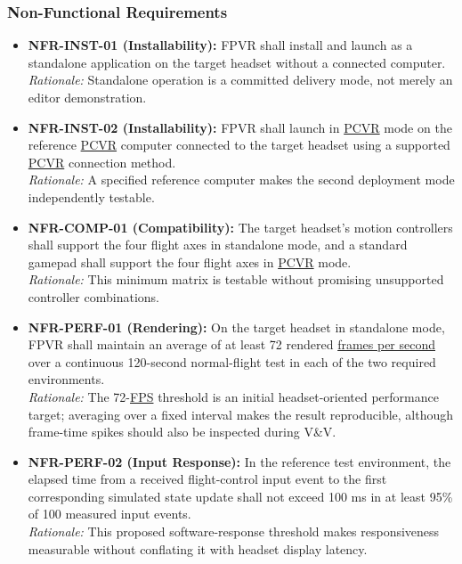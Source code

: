 \documentclass[12pt]{article}
\begin{document}
\subsubsection{Non-Functional Requirements}
\label{sec:s2-nfr}
\begin{itemize}
\item \hypertarget{req:NFR-INST-01}{}\textbf{NFR-INST-01 (Installability):} FPVR shall install and launch as a standalone application on the target headset without a connected computer.\\
\textit{Rationale:} Standalone operation is a committed delivery mode, not merely an editor demonstration.
\item \hypertarget{req:NFR-INST-02}{}\textbf{NFR-INST-02 (Installability):} FPVR shall launch in \hyperlink{glos:PCVR}{PCVR} mode on the reference \hyperlink{glos:PCVR}{PCVR} computer connected to the target headset using a supported \hyperlink{glos:PCVR}{PCVR} connection method.\\
\textit{Rationale:} A specified reference computer makes the second deployment mode independently testable.
\item \hypertarget{req:NFR-COMP-01}{}\textbf{NFR-COMP-01 (Compatibility):} The target headset's motion controllers shall support the four flight axes in standalone mode, and a standard gamepad shall support the four flight axes in \hyperlink{glos:PCVR}{PCVR} mode.\\
\textit{Rationale:} This minimum matrix is testable without promising unsupported controller combinations.
\item \hypertarget{req:NFR-PERF-01}{}\textbf{NFR-PERF-01 (Rendering):} On the target headset in standalone mode, FPVR shall maintain an average of at least 72 rendered \hyperlink{glos:FPS}{frames per second} over a continuous 120-second normal-flight test in each of the two required environments.\\
\textit{Rationale:} The 72-\hyperlink{glos:FPS}{FPS} threshold is an initial headset-oriented performance target; averaging over a fixed interval makes the result reproducible, although frame-time spikes should also be inspected during V\&V.
\item \hypertarget{req:NFR-PERF-02}{}\textbf{NFR-PERF-02 (Input Response):} In the reference test environment, the elapsed time from a received flight-control input event to the first corresponding simulated state update shall not exceed 100 ms in at least 95\% of 100 measured input events.\\
\textit{Rationale:} This proposed software-response threshold makes responsiveness measurable without conflating it with headset display latency.

\end{itemize}
\end{document}
